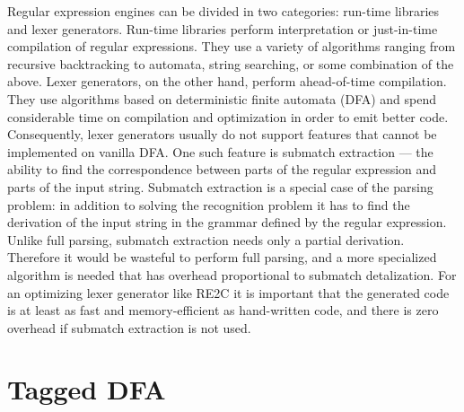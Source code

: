 \documentclass[preprint,12pt, a4paper]{elsarticle}
\begin{document}
\noindent
Regular expression engines can be divided in two categories: run-time libraries and lexer generators.
Run-time libraries perform interpretation or just-in-time compilation of regular expressions.
They use a variety of algorithms ranging from recursive backtracking to automata, string searching, or some combination of the above.
Lexer generators, on the other hand, perform ahead-of-time compilation.
They use algorithms based on deterministic finite automata (DFA) and spend considerable time on compilation and optimization in order to emit better code.
Consequently, lexer generators usually do not support features that cannot be implemented on vanilla DFA.
One such feature is submatch extraction --- the ability to find the correspondence between parts of the regular expression and parts of the input string.
Submatch extraction is a special case of the parsing problem:
in addition to solving the recognition problem it has to find the derivation of the input string in the grammar defined by the regular expression.
Unlike full parsing, submatch extraction needs only a partial derivation.
Therefore it would be wasteful to perform full parsing,
and a more specialized algorithm is needed that has overhead proportional to submatch detalization.
For an optimizing lexer generator like RE2C \cite{RE2C} \cite{RE2Cx} it is important that the generated code is at least as fast and memory-efficient as hand-written code,
and there is zero overhead if submatch extraction is not used.

\section{Tagged DFA}
\end{document}
